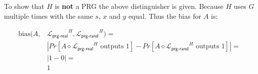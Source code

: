 \documentclass[12pt]{article}
\renewcommand{\L}{\ensuremath{\mathscr{L}}\xspace}
\newcommand{\lib}[1]{\ensuremath{\L_{\textsf{#1}}}\xspace}
\newcommand{\myterm}[1]{\ensuremath{\text{#1}}\xspace}
\newcommand{\bias}{\myterm{bias}}
\newcommand{\link}{\diamond}
\begin{document}
\noindent
To show that $H$ is \textbf{not} a PRG the above distinguisher is given.
Because $H$ uses $G$ multiple times with the same $s$, $x$ and $y$
equal. Thus the bias for $A$ is:

\begin{align*}
    \bias(A, &\lib{prg-real}^{H}, \lib{prg-rand}^{H}) = \\
             &| Pr[A \link \lib{prg-real}^{H} \mbox{ outputs 1}] - Pr[A
\link \lib{prg-rand}^H \mbox{ outputs 1}] | = \\
             &| 1 - 0 | =\\
             & 1
\end{align*}
\end{document}
